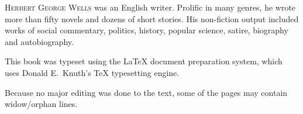 \cleartorecto
\backmatter

\thispagestyle{empty}
\label{ch:author}
\begin{ChapterStart}
\vspace*{4\nbs}
\end{ChapterStart}

\textsc{Herbert George Wells} was an English writer. Prolific in many genres, he wrote more than fifty novels and dozens of short stories. His non-fiction output included works of social commentary, politics, history, popular science, satire, biography and autobiography.

\cleartorecto

\thispagestyle{empty}
\null\vfill
\begin{adjustwidth}{3em}{3em}
This book was typeset using the \LaTeX{} document preparation system, which uses Donald E.~Knuth’s \TeX{} typesetting engine.

\null

\noindent Because no major editing was done to the text, some of the pages may contain widow/orphan lines.
\end{adjustwidth}

\vfill{}

\cleartoend
